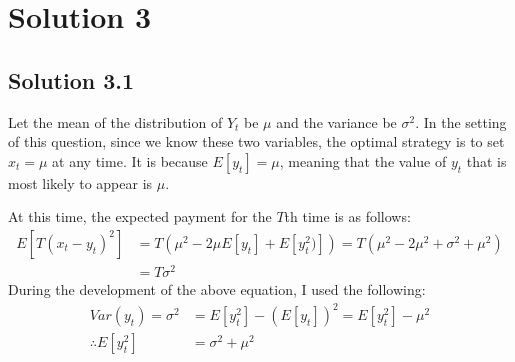 \documentclass[a4paper]{article}
\theoremstyle{definition}
\newenvironment{soln}{
	\leavevmode\color{blue}\ignorespaces
}{}
\begin{document}
	\section*{Solution 3}
	\subsection*{Solution 3.1}
	\begin{soln}
	Let the mean of the distribution of $Y_t$ be $\mu$ and the variance be $\sigma^2$. In the setting of this question, since we know these two variables, the optimal strategy is to set $x_t = \mu$ at any time. It is because  $E[y_t] = \mu$, meaning that the value of $y_t$ that is most likely to appear is $\mu$.

	At this time, the expected payment for the $T$th time is as follows:
		\begin{equation*}\label{xx}
			\begin{split}
		E[T (x_t - y_t)^2] &= T (\mu^2 - 2 \mu E[y_t] + E[y_t^2)]) = T (\mu^2 - 2 \mu^2 + \sigma^2 + \mu^2) \\
		&= T \sigma^2
			\end{split}
		\end{equation*}	
During the development of the above equation, I used the following:
		\begin{equation*}\label{xx}
			\begin{split}
			Var(y_t) = \sigma^2 &= E[y_t^2] - (E[y_t])^2 = E[y_t^2] - \mu^2 \\
			\therefore E[y_t^2] &=  \sigma^2 + \mu^2
			\end{split}
		\end{equation*}	
	
	\end{soln}
\end{document}
